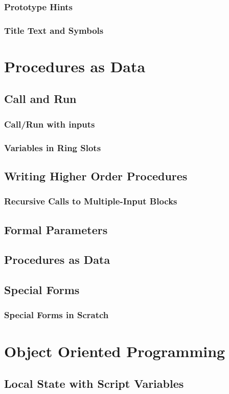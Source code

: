 \documentclass{report}
\begin{document}
\subsection{Prototype Hints}
\subsection{Title Text and Symbols}
\chapter{Procedures as Data}
\section{Call and Run}
\subsection{Call/Run with inputs}
\subsection{Variables in Ring Slots}
\section{Writing Higher Order Procedures}
\subsection{Recursive Calls to Multiple-Input Blocks}
\section{Formal Parameters}
\section{Procedures as Data}
\section{Special Forms}
\subsection{Special Forms in Scratch}
\chapter{Object Oriented Programming}
\section{Local State with Script Variables}
\end{document}
